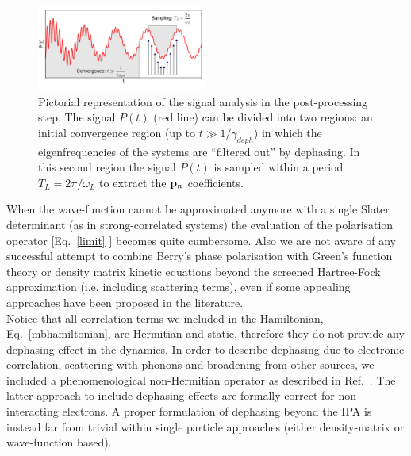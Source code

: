 \begin{figure}
	\includegraphics[width=0.5\textwidth]{Figures/Pt_analysis}
\caption{\footnotesize{Pictorial representation of the signal analysis in the post-processing step. The signal  $P(t)$ (red line) can be divided into two regions: an initial convergence region (up to $t\gg 1/\gamma_{deph}$) in which the eigenfrequencies of the systems are ``filtered out'' by dephasing. In this second region the signal $P(t)$ is sampled within a period $T_L=2\pi/\omega_L$ to extract the ${\bf p}_n$ coefficients. %
	\label{fg:ptanalysis} }} 
\end{figure}
When the wave-function cannot be approximated anymore with a single Slater determinant (as in strong-correlated systems) the evaluation of the polarisation operator [Eq.~\ref{limit} ] becomes quite cumbersome.\cite{stella} Also we are not aware of any successful attempt to combine Berry's phase polarisation with Green's function theory or density matrix kinetic equations beyond the screened Hartree-Fock approximation (i.e. including scattering terms), even if some appealing approaches have been proposed in the literature\cite{restagw,PhysRevB.84.205137,doi:10.7566/JPSJ.83.033708,nourafkan2013electric}.\\
Notice that all correlation terms we included in the Hamiltonian, Eq.~\ref{mbhamiltonian}, are Hermitian and static, therefore they do not provide any dephasing effect in the dynamics. In order to describe dephasing due to electronic correlation, scattering with phonons and broadening from other sources, we included a phenomenological non-Hermitian operator as described in Ref.~. The latter approach to include dephasing effects are formally correct for non-interacting electrons. A proper formulation of dephasing beyond the IPA is instead far from trivial within single particle approaches (either density-matrix or wave-function based).\cite{sangalli2021excitons}
%
%

